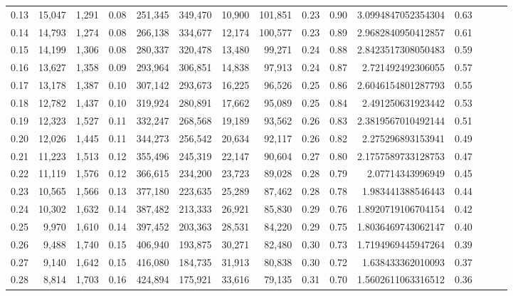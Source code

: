 \begin{tabular}{rrrrrrrrrrrrrrr}
0.13 &  15,047 &  1,291 &  0.08 &  251,345 &  349,470 &   10,900 &  101,851 &  0.23 &  0.90 &    3.0994847052354304 &      0.63 \\
0.14 &  14,793 &  1,274 &  0.08 &  266,138 &  334,677 &   12,174 &  100,577 &  0.23 &  0.89 &    2.9682840950412857 &      0.61 \\
0.15 &  14,199 &  1,306 &  0.08 &  280,337 &  320,478 &   13,480 &   99,271 &  0.24 &  0.88 &    2.8423517308050483 &      0.59 \\
0.16 &  13,627 &  1,358 &  0.09 &  293,964 &  306,851 &   14,838 &   97,913 &  0.24 &  0.87 &     2.721492492306055 &      0.57 \\
0.17 &  13,178 &  1,387 &  0.10 &  307,142 &  293,673 &   16,225 &   96,526 &  0.25 &  0.86 &    2.6046154801287793 &      0.55 \\
0.18 &  12,782 &  1,437 &  0.10 &  319,924 &  280,891 &   17,662 &   95,089 &  0.25 &  0.84 &     2.491250631923442 &      0.53 \\
0.19 &  12,323 &  1,527 &  0.11 &  332,247 &  268,568 &   19,189 &   93,562 &  0.26 &  0.83 &    2.3819567010492144 &      0.51 \\
0.20 &  12,026 &  1,445 &  0.11 &  344,273 &  256,542 &   20,634 &   92,117 &  0.26 &  0.82 &     2.275296893153941 &      0.49 \\
0.21 &  11,223 &  1,513 &  0.12 &  355,496 &  245,319 &   22,147 &   90,604 &  0.27 &  0.80 &    2.1757589733128753 &      0.47 \\
0.22 &  11,119 &  1,576 &  0.12 &  366,615 &  234,200 &   23,723 &   89,028 &  0.28 &  0.79 &      2.07714343996949 &      0.45 \\
0.23 &  10,565 &  1,566 &  0.13 &  377,180 &  223,635 &   25,289 &   87,462 &  0.28 &  0.78 &     1.983441388546443 &      0.44 \\
0.24 &  10,302 &  1,632 &  0.14 &  387,482 &  213,333 &   26,921 &   85,830 &  0.29 &  0.76 &    1.8920719106704154 &      0.42 \\
0.25 &   9,970 &  1,610 &  0.14 &  397,452 &  203,363 &   28,531 &   84,220 &  0.29 &  0.75 &    1.8036469743062147 &      0.40 \\
0.26 &   9,488 &  1,740 &  0.15 &  406,940 &  193,875 &   30,271 &   82,480 &  0.30 &  0.73 &    1.7194969445947264 &      0.39 \\
0.27 &   9,140 &  1,642 &  0.15 &  416,080 &  184,735 &   31,913 &   80,838 &  0.30 &  0.72 &     1.638433362010093 &      0.37 \\
0.28 &   8,814 &  1,703 &  0.16 &  424,894 &  175,921 &   33,616 &   79,135 &  0.31 &  0.70 &    1.5602611063316512 &      0.36 \\

\end{tabular}

